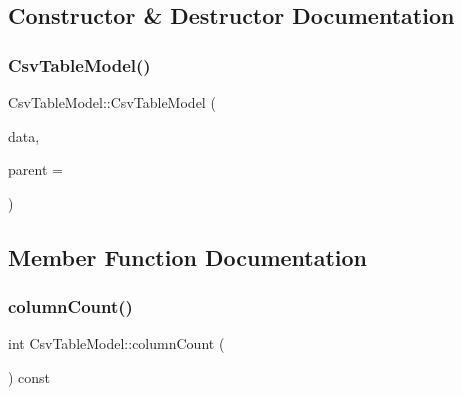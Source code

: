 \subsection{Constructor \& Destructor Documentation}
\mbox{\label{class_csv_table_model_abb394c4ca904ec2b7c658edc57357df4}} 
\subsubsection{\texorpdfstring{CsvTableModel()}{CsvTableModel()}}
{\footnotesize\ttfamily Csv\+Table\+Model\+::\+Csv\+Table\+Model (\begin{DoxyParamCaption}\item[{std\+::shared\+\_\+ptr$<$ Q\+List$<$ Q\+String\+List $>$ $>$}]{data,  }\item[{Q\+Object $\ast$}]{parent = {} }\end{DoxyParamCaption})\hspace{0.3cm}{\ttfamily [explicit]}}



\subsection{Member Function Documentation}
\mbox{\label{class_csv_table_model_a6de6f733dcd74740ffe1f8ddd8090f2b}} 
\subsubsection{\texorpdfstring{columnCount()}{columnCount()}}
{\footnotesize\ttfamily int Csv\+Table\+Model\+::column\+Count (\begin{DoxyParamCaption}\item[{const Q\+Model\+Index \&}]{ }\end{DoxyParamCaption}) const\hspace{0.3cm}{\ttfamily [inline]}}

\mbox{\label{class_csv_table_model_a110efb7633d6ada7e1aa69cd798a0784}} 
